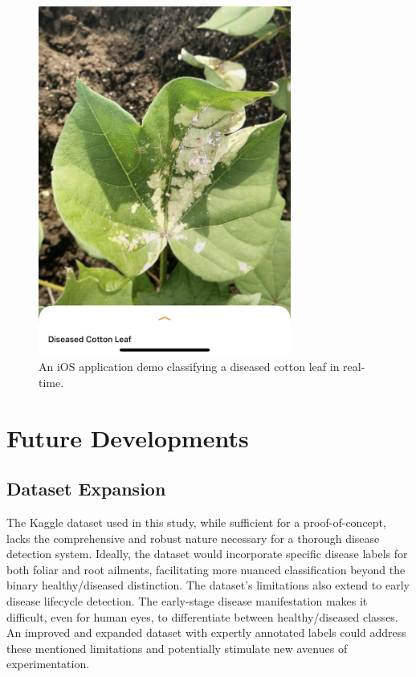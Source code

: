 \documentclass[conference]{IEEEtran}
\begin{document}
\begin{figure}[h]
\centerline{\includegraphics[height=11.5cm, width =.9\linewidth]{Images/Diseased Cotton Leaf.png}}
\caption{An iOS application demo classifying a diseased cotton leaf in real-time.}
\label{DiseasedCottonLeaf}
\end{figure}

\section{Future Developments}

\subsection{Dataset Expansion}

The Kaggle dataset used in this study, while sufficient for a proof-of-concept, lacks the comprehensive and robust nature necessary for a thorough disease detection system. Ideally, the dataset would incorporate specific disease labels for both foliar and root ailments, facilitating more nuanced classification beyond the binary healthy/diseased distinction. The dataset's limitations also extend to early disease lifecycle detection. The early-stage disease manifestation makes it difficult, even for human eyes, to differentiate between healthy/diseased classes. An improved and expanded dataset with expertly annotated labels could address these mentioned limitations and potentially stimulate new avenues of experimentation.
\end{document}

